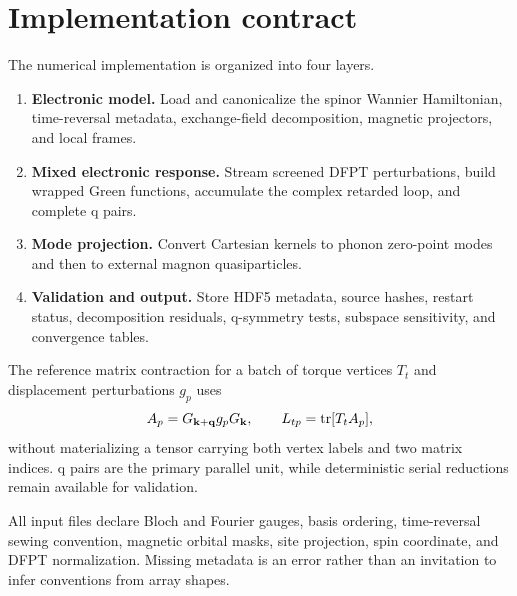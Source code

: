 \section{Implementation contract}
\label{sec:implementation}

The numerical implementation is organized into four layers.

\begin{enumerate}
\item \textbf{Electronic model.} Load and canonicalize the spinor Wannier Hamiltonian, time-reversal metadata, exchange-field decomposition, magnetic projectors, and local frames.
\item \textbf{Mixed electronic response.} Stream screened DFPT perturbations, build wrapped Green functions, accumulate the complex retarded loop, and complete q pairs.
\item \textbf{Mode projection.} Convert Cartesian kernels to phonon zero-point modes and then to external magnon quasiparticles.
\item \textbf{Validation and output.} Store HDF5 metadata, source hashes, restart status, decomposition residuals, q-symmetry tests, subspace sensitivity, and convergence tables.
\end{enumerate}

The reference matrix contraction for a batch of torque vertices $T_t$ and displacement perturbations $g_p$ uses
\begin{equation}
A_p=G_{\mathbf k+\mathbf q}g_pG_\mathbf k,
\qquad
L_{tp}=\operatorname{tr}[T_tA_p],
\label{eq:batch-contraction}
\end{equation}
without materializing a tensor carrying both vertex labels and two matrix indices. q pairs are the primary parallel unit, while deterministic serial reductions remain available for validation.

All input files declare Bloch and Fourier gauges, basis ordering, time-reversal sewing convention, magnetic orbital masks, site projection, spin coordinate, and DFPT normalization. Missing metadata is an error rather than an invitation to infer conventions from array shapes.
